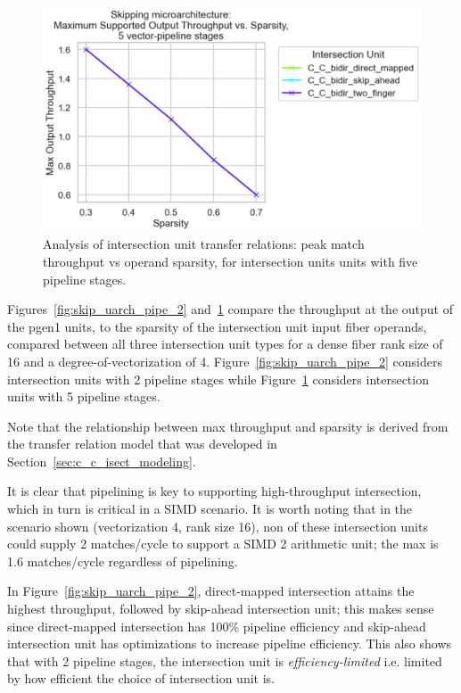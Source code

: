 \begin{figure}[H]
\includegraphics[width=\textwidth]{figures/skip_uarch_pipe_5.png}
\caption{Analysis of intersection unit transfer relations: peak match throughput vs operand sparsity, for intersection units units with five pipeline stages.}
\label{fig:skip_uarch_pipe_5}
\end{figure}

Figures~\ref{fig:skip_uarch_pipe_2} and~\ref{fig:skip_uarch_pipe_5} compare the throughput at the output of the pgen1 units, to the sparsity of the intersection unit input fiber operands, compared between all three intersection unit types for a dense fiber rank size of 16 and a degree-of-vectorization of 4. Figure~\ref{fig:skip_uarch_pipe_2} considers intersection units with 2 pipeline stages while Figure~\ref{fig:skip_uarch_pipe_5} considers intersection units with 5 pipeline stages. 

Note that the relationship between max throughput and sparsity is derived from the transfer relation model that was developed in Section~\ref{sec:c_c_isect_modeling}.

It is clear that pipelining is key to supporting high-throughput intersection, which in turn is critical in a SIMD scenario. It is worth noting that in the scenario shown (vectorization 4, rank size 16), non of these intersection units could supply 2 matches/cycle to support a SIMD 2 arithmetic unit; the max is 1.6 matches/cycle regardless of pipelining. 

In Figure~\ref{fig:skip_uarch_pipe_2}, direct-mapped intersection attains the highest throughput, followed by skip-ahead intersection unit; this makes sense since direct-mapped intersection has 100\% pipeline efficiency and skip-ahead intersection unit has optimizations to increase pipeline efficiency. This also shows that with 2 pipeline stages, the intersection unit is \textit{efficiency-limited} i.e. limited by how efficient the choice of intersection unit is.

